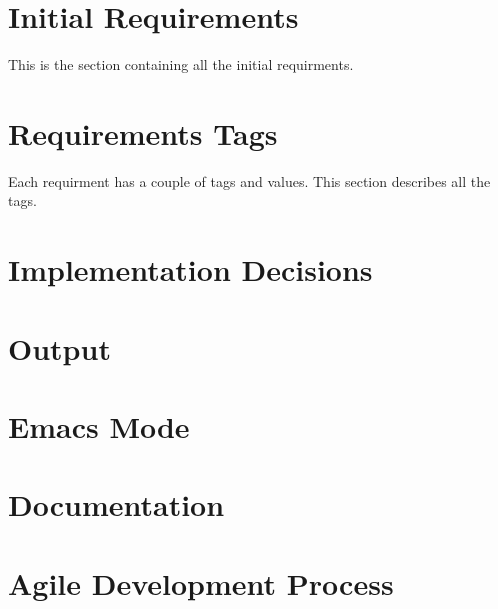 \documentclass{article}
\begin{document}
\section{Initial Requirements}
This is the section containing all the initial requirments.









\section{Requirements Tags}
Each requirment has a couple of tags and values.  This section
describes all the tags.









\section{Implementation Decisions}




\section{Output}




\section{Emacs Mode}



\section{Documentation}



\section{Agile Development Process}


\end{document}

